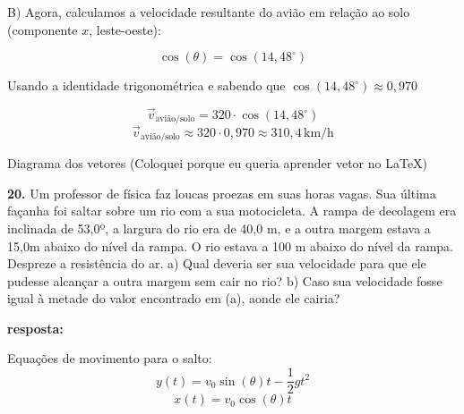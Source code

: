 \documentclass[a4paper, 12pt]{article}
\begin{document}
\begin{flushleft}
			B) Agora, calculamos a velocidade resultante do avião em relação ao solo (componente $x$, leste-oeste):

			\begin{equation*}
				\cos(\theta) = \cos(14,48^\circ)	
			\end{equation*}
						
			Usando a identidade trigonométrica e sabendo que $\cos(14,48^\circ) \approx 0,970$
			
			\begin{equation*}
				\vec{v}_\text{avião/solo} = 320 \cdot \cos(14,48^\circ)	
			\end{equation*}
			\begin{equation*}
				\vec{v}_\text{avião/solo} \approx 320 \cdot 0,970 \approx 310,4 \, \text{km/h}	
			\end{equation*}
			
			
			Diagrama dos vetores (Coloquei porque eu queria aprender vetor no LaTeX)
			\begin{center}
			\end{center}
		
		\vspace{2em}
		
		\textbf{20.}  Um professor de física faz loucas proezas em suas horas vagas. Sua última façanha foi saltar sobre um rio com a sua motocicleta. A rampa de decolagem era inclinada de 53,0º, a largura do rio era de 40,0 m, e a outra margem estava a 15,0m abaixo do nível da rampa. O rio estava a 100 m abaixo do nível da rampa. Despreze a resistência do ar. a) Qual deveria ser sua velocidade para que ele pudesse alcançar a outra margem sem cair no rio? b) Caso sua velocidade fosse igual à metade do valor encontrado em (a), aonde ele cairia?
		
		\textbf{resposta:}
	
		Equações de movimento para o salto:
		\begin{equation*}
			y(t) = v_0 \sin(\theta) t - \frac{1}{2}gt^2
		\end{equation*}
		\begin{equation*}
			x(t) = v_0 \cos(\theta) t
		\end{equation*}
		

\end{flushleft}
\end{document}

